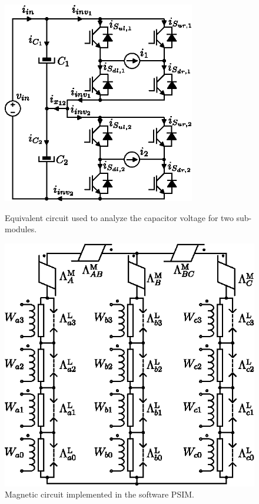 \documentclass[a4paper,oneside,onecolumn,draftcls,12pt,conference]{IEEEtran}
\begin{document}
 \begin{figure}[!h]
 	\centering
 	\begin{minipage}[b]{0.45\textwidth}	\centering
 		\includegraphics[width=0.75\textwidth]{Figs/MHF1F_ix.eps}
 		\caption{Equivalent circuit used to analyze the capacitor voltage for two sub-modules.}
 		\label{fig:MHF1F_ix}
 	\end{minipage}
 	\quad
 	\begin{minipage}[b]{0.45\textwidth} 	\centering
 		\includegraphics[width=0.8\linewidth]{Figs/MagneticCircuit}
 		\caption{Magnetic circuit implemented in the software PSIM.}
 		\label{fig:MagneticCircuit}
 	\end{minipage}
 \end{figure}
 
\end{document}
